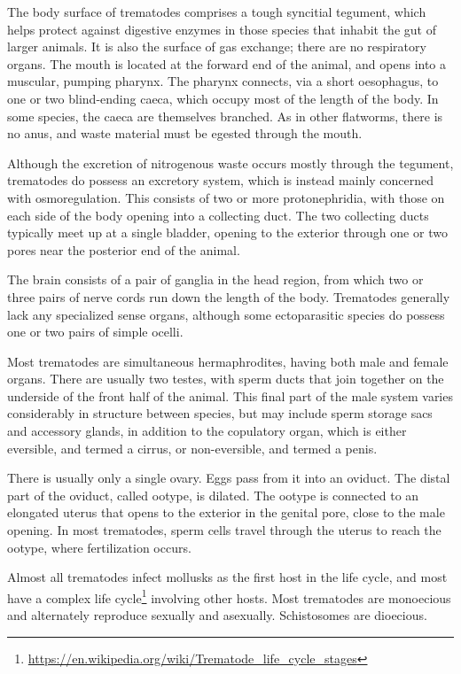 \documentclass[]{book}
\let\rmarkdownfootnote\footnote%
\def\footnote{\protect\rmarkdownfootnote}
\renewcommand{\href}[2]{#2\footnote{\url{#1}}}
\theoremstyle{definition}
\theoremstyle{definition}
\theoremstyle{definition}
\theoremstyle{remark}
\begin{document}
The body surface of trematodes comprises a tough syncitial tegument,
which helps protect against digestive enzymes in those species that
inhabit the gut of larger animals. It is also the surface of gas
exchange; there are no respiratory organs. The mouth is located at the
forward end of the animal, and opens into a muscular, pumping pharynx.
The pharynx connects, via a short oesophagus, to one or two blind-ending
caeca, which occupy most of the length of the body. In some species, the
caeca are themselves branched. As in other flatworms, there is no anus,
and waste material must be egested through the mouth.

Although the excretion of nitrogenous waste occurs mostly through the
tegument, trematodes do possess an excretory system, which is instead
mainly concerned with osmoregulation. This consists of two or more
protonephridia, with those on each side of the body opening into a
collecting duct. The two collecting ducts typically meet up at a single
bladder, opening to the exterior through one or two pores near the
posterior end of the animal.

The brain consists of a pair of ganglia in the head region, from which
two or three pairs of nerve cords run down the length of the body.
Trematodes generally lack any specialized sense organs, although some
ectoparasitic species do possess one or two pairs of simple ocelli.

Most trematodes are simultaneous hermaphrodites, having both male and
female organs. There are usually two testes, with sperm ducts that join
together on the underside of the front half of the animal. This final
part of the male system varies considerably in structure between
species, but may include sperm storage sacs and accessory glands, in
addition to the copulatory organ, which is either eversible, and termed
a cirrus, or non-eversible, and termed a penis.

There is usually only a single ovary. Eggs pass from it into an oviduct.
The distal part of the oviduct, called ootype, is dilated. The ootype is
connected to an elongated uterus that opens to the exterior in the
genital pore, close to the male opening. In most trematodes, sperm cells
travel through the uterus to reach the ootype, where fertilization
occurs.

Almost all trematodes infect mollusks as the first host in the life
cycle, and most have a
\href{https://en.wikipedia.org/wiki/Trematode_life_cycle_stages}{complex
life cycle} involving other hosts. Most trematodes are monoecious and
alternately reproduce sexually and asexually. Schistosomes are
dioecious.
\end{document}
